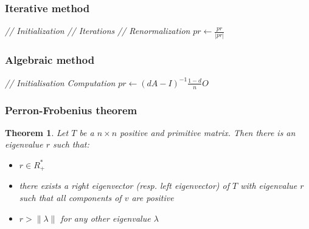 \documentclass[10pt]{beamer}
\newtheorem{theo}{Theorem}
\begin{document}
\begin{frame}
  \frametitle{Iterative method}
\IncMargin{1em}
\begin{algorithm}[H]
\BlankLine
\Indm
{}
\Indp
\BlankLine
\emph{// Initialization}\;
\emph{// Iterations}\;
\emph{// Renormalization}\;
$pr\leftarrow\frac{pr}{|pr|}$\;
\BlankLine
\end{algorithm}
\DecMargin{1em}
\end{frame}

\begin{frame}
  \frametitle{Algebraic method}
\IncMargin{1em}
\begin{algorithm}[H]
\BlankLine
\Indm
{}
\Indp
\BlankLine
\emph{// Initialisation}\;
\emph{Computation}\;
$pr\leftarrow \left(dA-I\right)^{-1}\frac{1-d}{n}O$
\BlankLine
\end{algorithm}
\DecMargin{1em}
\end{frame}

\begin{frame}
  \frametitle{Perron-Frobenius theorem}
  \begin{theo}
    Let $T$ be a $n \times n$ positive and primitive matrix. Then there is an eigenvalue $r$ such that:
    \begin{itemize}
      \item $r \in R^*_+$
      \item there exists a right eigenvector (resp. left eigenvector) of $T$ with eigenvalue $r$ such that all components of $v$ are positive
      \item $r > \| \lambda \|$ for any other eigenvalue $\lambda$
    \end{itemize}
  \end{theo}
\end{frame}
\end{document}
